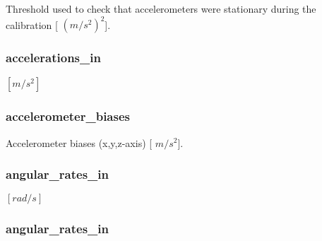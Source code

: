 \-Threshold used to check that accelerometers were stationary during the calibration \mbox{[} $(m/s^2)^2$\mbox{]}. 

\hypertarget{group__tables_gaf92cab44915b7d9faaf5aeadb328bae6}{
\subsubsection[{accelerations\-\_\-in}]{ {\bf accelerations\-\_\-in}}}
\label{group__tables_gaf92cab44915b7d9faaf5aeadb328bae6}


$[m/s^2]$ 

\hypertarget{group__tables_ga1089eea940f41eff26a6cba1172089e9}{
\subsubsection[{accelerometer\-\_\-biases}]{ {\bf accelerometer\-\_\-biases}}}
\label{group__tables_ga1089eea940f41eff26a6cba1172089e9}


\-Accelerometer biases (x,y,z-\/axis) \mbox{[} $m/s^2$\mbox{]}. 

\hypertarget{group__tables_ga8cac4b2812dcb492989d7122c5eb0bfb}{
\subsubsection[{angular\-\_\-rates\-\_\-in}]{ {\bf angular\-\_\-rates\-\_\-in}}}
\label{group__tables_ga8cac4b2812dcb492989d7122c5eb0bfb}


$[rad/s]$ 

\hypertarget{group__tables_ga8cac4b2812dcb492989d7122c5eb0bfb}{
\subsubsection[{angular\-\_\-rates\-\_\-in}]{ {\bf angular\-\_\-rates\-\_\-in}}}
\label{group__tables_ga8cac4b2812dcb492989d7122c5eb0bfb}


